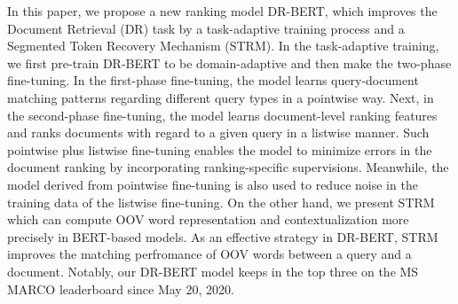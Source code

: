 In this paper, we propose a new ranking model DR-BERT, which improves the Document Retrieval (DR) task by a task-adaptive training process and a Segmented Token Recovery Mechanism (STRM). In the task-adaptive training, we first pre-train DR-BERT to be domain-adaptive and then make the two-phase fine-tuning. In the first-phase fine-tuning, the model learns query-document matching patterns regarding different query types in a pointwise way. Next, in the second-phase fine-tuning, the model learns document-level ranking features and ranks documents with regard to a given query in a listwise manner. Such pointwise plus listwise fine-tuning enables the model to minimize errors in the document ranking by incorporating ranking-specific supervisions. Meanwhile, the model derived from pointwise fine-tuning is also used to reduce noise in the training data of the listwise fine-tuning. On the other hand, we present STRM which can compute OOV word representation and contextualization more precisely in BERT-based models. As an effective strategy in DR-BERT, STRM improves the matching perfromance of OOV words between a query and a document. Notably, our DR-BERT model keeps in the top three on the MS MARCO leaderboard since May 20, 2020.

